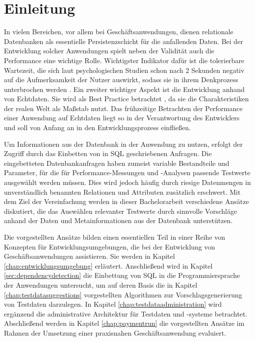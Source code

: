 \section{Einleitung}\label{chap:introduction}

%
%

In vielen Bereichen, vor allem bei Geschäftsanwendungen, dienen relationale Datenbanken als essentielle Persistenzschicht für die anfallenden Daten.
Bei der Entwicklung solcher Anwendungen spielt neben der Validität auch die Performance eine wichtige Rolle.
Wichtigster Indikator dafür ist die tolerierbare Wartezeit, die sich laut psychologischen Studien schon nach 2 Sekunden negativ auf die Aufmerksamkeit der Nutzer auswirkt, sodass sie in ihrem Denkprozess unterbrochen werden \cite{Nah04}.
Ein zweiter wichtiger Aspekt ist die Entwicklung anhand von Echtdaten.
Sie wird als Best Practice betrachtet \cite{Plattner:2013:CID:2490529}, da sie die Charakteristiken der realen Welt als Maßstab nutzt.
Das frühzeitige Betrachten der Performance einer Anwendung auf Echtdaten liegt so in der Verantwortung des Entwicklers und soll von Anfang an in den Entwicklungsprozess einfließen.

Um Informationen aus der Datenbank in der Anwendung zu nutzen, erfolgt der Zugriff durch das Einbetten von in SQL geschriebenen Anfragen.
Die eingebetteten Datenbankanfragen haben zumeist variable Bestandteile und Parameter, für die für Performance-Messungen und -Analysen passende Testwerte ausgewählt werden müssen.
Dies wird jedoch häufig durch riesige Datenmengen in unverständlich benannten Relationen und Attributen zusätzlich erschwert.
Mit dem Ziel der Vereinfachung werden in dieser Bachelorarbeit verschiedene Ansätze diskutiert, die das Auswählen relevanter Testwerte durch sinnvolle Vorschläge anhand der Daten und Metainformationen aus der Datenbank unterstützen.

Die vorgestellten Ansätze bilden einen essentiellen Teil in einer Reihe von Konzepten für Entwicklungsumgebungen, die bei der Entwicklung von Geschäftsanwendungen assistieren.
Sie werden in Kapitel \ref{chap:entwicklungsumgebung} erläutert.
Anschließend wird in Kapitel \ref{sec:dependencydetection} die Einbettung von SQL in die Programmiersprache der Anwendungen untersucht, um auf deren Basis die in Kapitel \ref{chap:testdatasuggestions} vorgestellten Algorithmen zur Vorschlagsgenerierung von Testdaten darzulegen.
In Kapitel \ref{chap:testdataadministration} wird ergänzend die administrative Architektur für Testdaten und -systeme betrachtet.
Abschließend werden in Kapitel \ref{chap:paymentrun} die vorgestellten Ansätze im Rahmen der Umsetzung einer praxisnahen Geschäftsanwendung evaluiert.
